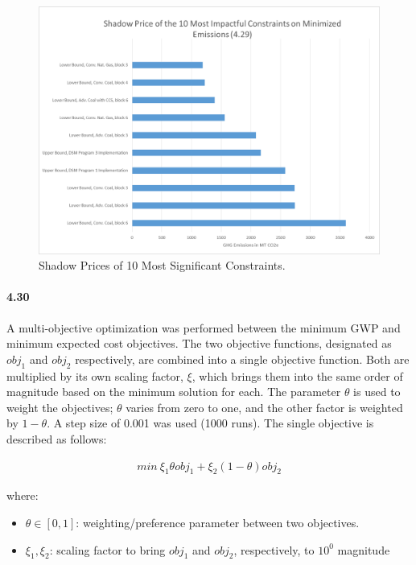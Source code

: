 \documentclass{article}
\begin{document}
		\begin{figure}
		\includegraphics[width=\textwidth]{429_6_sensitivity}
		\caption{Shadow Prices of 10 Most Significant Constraints.}
		\end{figure}



\paragraph{4.30}
	A multi-objective optimization was performed between the minimum GWP and minimum expected cost objectives. The two objective functions, designated as $obj_1$ and $obj_2$ respectively, are combined into a single objective function. Both are multiplied by its own scaling factor, $\xi$, which brings them into the same order of magnitude based on the minimum solution for each. The parameter $\theta$ is used to weight the objectives; $\theta$ varies from zero to one, and the other factor is weighted by $1-\theta$. A step size of 0.001 was used (1000 runs). The single objective is described as follows: 

	\begin{align*}
		min \ \xi_1 \theta obj_1  + \xi_2 (1-\theta) obj_2 
	\end{align*}
	
	where:
	\begin{itemize}
		\item $\theta \in [0, 1]$: weighting/preference parameter between two objectives.
		\item $\xi_1, \xi_2$: scaling factor to bring $obj_1$ and $obj_2$, respectively, to $10^0$ magnitude
	\end{itemize}
\end{document}

